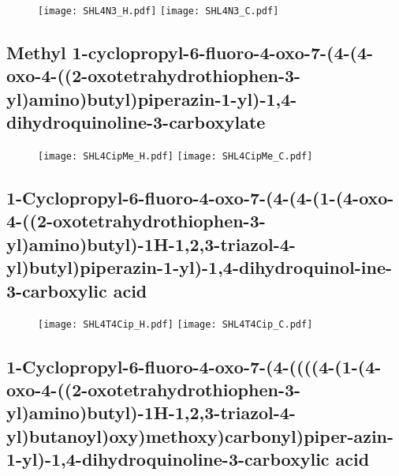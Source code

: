 \begin{figure}[H]
	\centering
		\texttt{[image: SHL4N3\_H.pdf]}
		\texttt{[image: SHL4N3\_C.pdf]}
\end{figure}

\subsection{Methyl 1\hyp{}cyclopropyl\hyp{}6\hyp{}fluoro\hyp{}4\hyp{}oxo\hyp{}7\hyp{}(4\hyp{}(4\hyp{}oxo\hyp{}4\hyp{}((2\hyp{}oxotetrahydrothiophen\hyp{}3\hyp{}yl)amino)butyl)piperazin\hyp{}1\hyp{}yl)\hyp{}1,4\hyp{}dihydroquinoline\hyp{}3\hyp{}carboxylate }

\begin{figure}[H]
	\centering
		\texttt{[image: SHL4CipMe\_H.pdf]}
		\texttt{[image: SHL4CipMe\_C.pdf]}
\end{figure}

\subsection{1\hyp{}Cyclopropyl\hyp{}6\hyp{}fluoro\hyp{}4\hyp{}oxo\hyp{}7\hyp{}(4\hyp{}(4\hyp{}(1\hyp{}(4\hyp{}oxo\hyp{}4\hyp{}((2\hyp{}oxotetrahydrothiophen\hyp{}3\hyp{}yl)amino)butyl)\hyp{}1H\hyp{}1,2,3\hyp{}triazol\hyp{}4\hyp{}yl)butyl)piperazin\hyp{}1\hyp{}yl)\hyp{}1,4\hyp{}dihydroquinol\hyp{}ine\hyp{}3\hyp{}carboxylic acid }

\begin{figure}[H]
	\centering
		\texttt{[image: SHL4T4Cip\_H.pdf]}
		\texttt{[image: SHL4T4Cip\_C.pdf]}
\end{figure}

\subsection{1\hyp{}Cyclopropyl\hyp{}6\hyp{}fluoro\hyp{}4\hyp{}oxo\hyp{}7\hyp{}(4\hyp{}((((4\hyp{}(1\hyp{}(4\hyp{}oxo\hyp{}4\hyp{}((2\hyp{}oxotetrahydrothiophen\hyp{}3\hyp{}yl)amino)butyl)\hyp{}1H\hyp{}1,2,3\hyp{}triazol\hyp{}4\hyp{}yl)butanoyl)oxy)methoxy)carbonyl)piper\hyp{}azin\hyp{}1\hyp{}yl)\hyp{}1,4\hyp{}dihydroquinoline\hyp{}3\hyp{}carboxylic acid }

